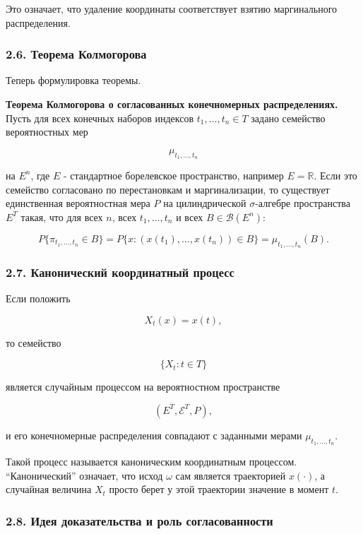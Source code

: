 \documentclass[
  11pt,
  a4paper,
]{article}
\begin{document}
Это означает, что удаление координаты соответствует взятию маргинального
распределения.

\subsubsection{2.6. Теорема
Колмогорова}\label{ux442ux435ux43eux440ux435ux43cux430-ux43aux43eux43bux43cux43eux433ux43eux440ux43eux432ux430}

Теперь формулировка теоремы.

\textbf{Теорема Колмогорова о согласованных конечномерных
распределениях.} Пусть для всех конечных наборов индексов
\(t_1,\ldots,t_n\in T\) задано семейство вероятностных мер

\[
\mu_{t_1,\ldots,t_n}
\]

на \(E^n\), где \(E\) - стандартное борелевское пространство, например
\(E=\mathbb R\). Если это семейство согласовано по перестановкам и
маргинализации, то существует единственная вероятностная мера \(P\) на
цилиндрической \(\sigma\)-алгебре пространства \(E^T\) такая, что для
всех \(n\), всех \(t_1,\ldots,t_n\) и всех \(B\in\mathcal B(E^n)\):

\[
P\{\pi_{t_1,\ldots,t_n}\in B\}
=
P\{x:(x(t_1),\ldots,x(t_n))\in B\}
=
\mu_{t_1,\ldots,t_n}(B).
\]

\subsubsection{2.7. Канонический координатный
процесс}\label{ux43aux430ux43dux43eux43dux438ux447ux435ux441ux43aux438ux439-ux43aux43eux43eux440ux434ux438ux43dux430ux442ux43dux44bux439-ux43fux440ux43eux446ux435ux441ux441}

Если положить

\[
X_t(x)=x(t),
\]

то семейство

\[
\{X_t:t\in T\}
\]

является случайным процессом на вероятностном пространстве

\[
(E^T,\mathcal E^T,P),
\]

и его конечномерные распределения совпадают с заданными мерами
\(\mu_{t_1,\ldots,t_n}\).

Такой процесс называется каноническим координатным процессом.
``Канонический'' означает, что исход \(\omega\) сам является траекторией
\(x(\cdot)\), а случайная величина \(X_t\) просто берет у этой
траектории значение в момент \(t\).

\subsubsection{2.8. Идея доказательства и роль
согласованности}\label{ux438ux434ux435ux44f-ux434ux43eux43aux430ux437ux430ux442ux435ux43bux44cux441ux442ux432ux430-ux438-ux440ux43eux43bux44c-ux441ux43eux433ux43bux430ux441ux43eux432ux430ux43dux43dux43eux441ux442ux438}
\end{document}
